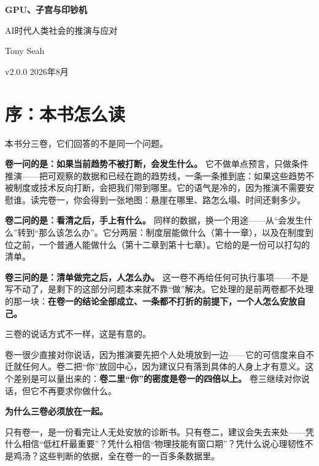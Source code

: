 \documentclass[11pt,a4paper]{ctexart}
\begin{document}
\begin{titlepage}
\centering
\vspace*{4cm}
{\Huge\bfseries GPU、子宫与印钞机\par}
\vspace{1cm}
{\LARGE\color{subtitlecolor} AI时代人类社会的推演与应对\par}
\vspace{3cm}
{\Large Tony Seah\par}
\vspace{3.8cm}
{\large v2.0.0 \quad 2026年8月\par}
\vfill
\end{titlepage}

\tableofcontents
\thispagestyle{empty}
\newpage
\setcounter{page}{1}

\section{序：本书怎么读}

本书分三卷，它们回答的不是同一个问题。

\textbf{卷一问的是：如果当前趋势不被打断，会发生什么。} 它不做单点预言，只做条件推演——把可观察的数据和已经在跑的趋势线，一条一条推到底：如果这些趋势不被制度或技术反向打断，会把我们带到哪里。它的语气是冷的，因为推演不需要安慰谁。读完卷一，你会得到一张地图：悬崖在哪里、路怎么塌、时间还剩多少。

\textbf{卷二问的是：看清之后，手上有什么。} 同样的数据，换一个用途——从“会发生什么”转到“那么该怎么办”。它分两层：制度层能做什么（第十一章），以及在制度到位之前，一个普通人能做什么（第十二章到第十七章）。它给的是一份可以打勾的清单。

\textbf{卷三问的是：清单做完之后，人怎么办。} 这一卷不再给任何可执行事项——不是写不动了，是剩下的这部分问题本来就不靠“做”解决。它处理的是前两卷都不处理的那一块：\textbf{在卷一的结论全部成立、一条都不打折的前提下，一个人怎么安放自己。}

三卷的说话方式不一样，这是有意的。

卷一很少直接对你说话，因为推演要先把个人处境放到一边——它的可信度来自不迁就任何人。卷二把“你”放回中心，因为建议只有落到具体的人身上才有意义。这个差别是可以量出来的：\textbf{卷二里“你”的密度是卷一的四倍以上。} 卷三继续对你说话，但它不再要求你做什么。

\textbf{为什么三卷必须放在一起。}

只有卷一，是一份看完让人无处安放的诊断书。只有卷二，建议会失去来处——凭什么相信“低杠杆最重要”？凭什么相信“物理技能有窗口期”？凭什么说心理韧性不是鸡汤？这些判断的依据，全在卷一的一百多条数据里。
\end{document}
